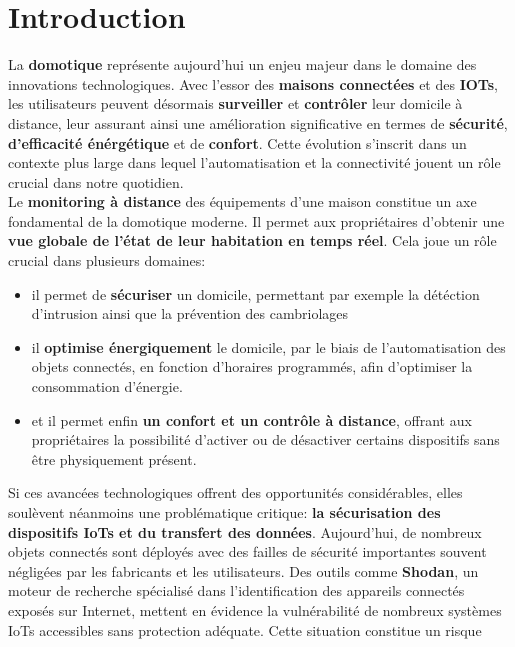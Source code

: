 \documentclass[10pt, a4paper]{report}
\begin{document}
	\chapter{Introduction}
		La \textbf{domotique} représente aujourd'hui un enjeu majeur dans le domaine des innovations technologiques. Avec l'essor des 
		\textbf{maisons connectées} et des \textbf{IOTs}, les utilisateurs peuvent désormais \textbf{surveiller} et \textbf{contrôler} 
		leur domicile à distance, leur assurant ainsi une amélioration significative en termes de \textbf{sécurité}, 
		\textbf{d'efficacité énérgétique} et de \textbf{confort}. Cette évolution s'inscrit dans un contexte plus large dans lequel 
		l'automatisation et la connectivité jouent un rôle crucial dans notre quotidien.\\
		Le \textbf{monitoring à distance} des équipements d'une maison constitue un axe fondamental de la domotique moderne. Il permet 
		aux propriétaires d'obtenir une \textbf{vue globale de l'état de leur habitation en temps réel}. Cela joue un rôle crucial dans 
		plusieurs domaines:
		\begin{itemize}
			\item il permet de \textbf{sécuriser} un domicile, permettant par exemple la détéction d'intrusion ainsi que la prévention 
			des cambriolages
			
			\item il \textbf{optimise énergiquement} le domicile, par le biais de l'automatisation des objets 
			connectés, en fonction d'horaires programmés, afin d'optimiser la consommation d'énergie.
			
			\item et il permet enfin \textbf{un confort et un contrôle à distance}, offrant aux propriétaires la possibilité d'activer ou 
			de désactiver certains dispositifs sans être physiquement présent.\\
		\end{itemize}
		Si ces avancées technologiques offrent des opportunités considérables, elles soulèvent néanmoins une problématique critique: 
		\textbf{la sécurisation des dispositifs IoTs et du transfert des données}. Aujourd'hui, de nombreux objets connectés sont 
		déployés avec des failles de sécurité importantes souvent négligées par les fabricants et les utilisateurs. Des outils comme 
		\textbf{Shodan}, un moteur de recherche spécialisé dans l'identification des appareils connectés exposés sur Internet, mettent 
		en évidence la vulnérabilité de nombreux systèmes IoTs accessibles sans protection adéquate. Cette situation constitue un risque 
\end{document}
